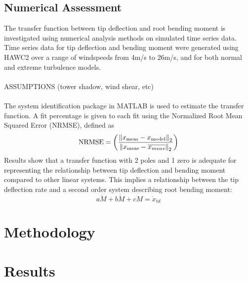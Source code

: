 \subsection{Numerical Assessment}
The transfer function between tip deflection and root bending moment is investigated using numerical analysis methods on simulated time series data. Time series data for tip deflection and bending moment were generated using HAWC2 over a range of windspeeds from 4m/s to 26m/s, and for both normal and extreme turbulence models. 
\\~\\
ASSUMPTIONS (tower shadow, wind shear, etc)
\\~\\
The system identification package in MATLAB is used to estimate the transfer function. A fit percentage is given to each fit using the Normalized Root Mean Squared Error (NRMSE), defined as
$$\text{NRMSE}=\left(\frac{\left\lVert x_{\text{meas}}-x_{\text{model}}\right\rVert_2}{\left\lVert x_{\text{meas}}-\overline{x_{meas}}\right\rVert_2}\right)$$
Results show that a transfer function with 2 poles and 1 zero is adequate for representing the relationship between tip deflection and bending moment compared to other linear systems. This implies a relationship between the tip deflection rate and a second order system describing root bending moment:
$$a\ddot{M} + b\dot{M} + cM = \dot{x}_{td}$$


\pagebreak

\section{Methodology}


\section{Results}

\pagebreak



